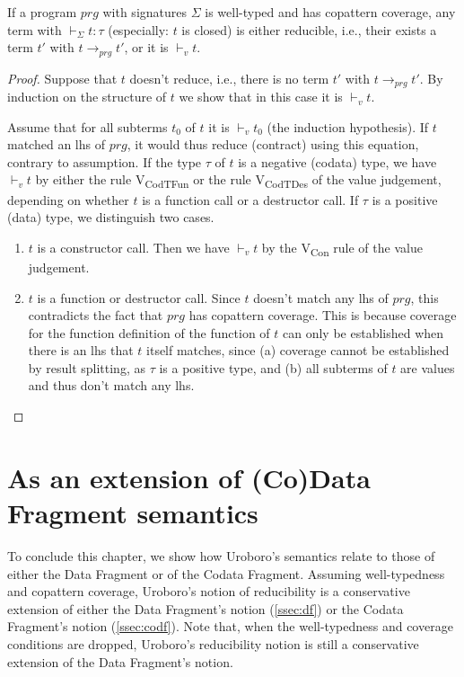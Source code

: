 \begin{lemma}[Progress]
If a program $prg$ with signatures $\Sigma$ is well-typed and has copattern coverage, any term with $\vdash_{\Sigma} t : \tau$ (especially: $t$ is closed) is either reducible, i.e., their exists a term $t'$ with $t \longrightarrow_{prg} t'$, or it is $\vdash_v t$.
\begin{proof}
Suppose that $t$ doesn't reduce, i.e., there is no term $t'$ with $t \longrightarrow_{prg} t'$. By induction on the structure of $t$ we show that in this case it is $\vdash_v t$.

Assume that for all subterms $t_0$ of $t$ it is $\vdash_v t_0$ (the induction hypothesis). If $t$ matched an lhs of $prg$, it would thus reduce (contract) using this equation, contrary to assumption. If the type $\tau$ of $t$ is a negative (codata) type, we have $\vdash_v t$ by either the rule V\textsubscript{CodTFun} or the rule V\textsubscript{CodTDes} of the value judgement, depending on whether $t$ is a function call or a destructor call. If $\tau$ is a positive (data) type, we distinguish two cases.
\begin{enumerate}
\item $t$ is a constructor call. Then we have $\vdash_v t$ by the V\textsubscript{Con} rule of the value judgement.

\item $t$ is a function or destructor call. Since $t$ doesn't match any lhs of $prg$, this contradicts the fact that $prg$ has copattern coverage. This is because coverage for the function definition of the function of $t$ can only be established when there is an lhs that $t$ itself matches, since (a) coverage cannot be established by result splitting, as $\tau$ is a positive type, and (b) all subterms of $t$ are values and thus don't match any lhs.
\end{enumerate}
\end{proof}
\end{lemma}

\section{As an extension of (Co)Data Fragment semantics}
\label{sec:codfragext}

To conclude this chapter, we show how Uroboro's semantics relate to those of either the Data Fragment or of the Codata Fragment. Assuming well-typedness and copattern coverage, Uroboro's notion of reducibility is a conservative extension of either the Data Fragment's notion (\autoref{ssec:df}) or the Codata Fragment's notion (\autoref{ssec:codf}). Note that, when the well-typedness and coverage conditions are dropped, Uroboro's reducibility notion is still a conservative extension of the Data Fragment's notion.

